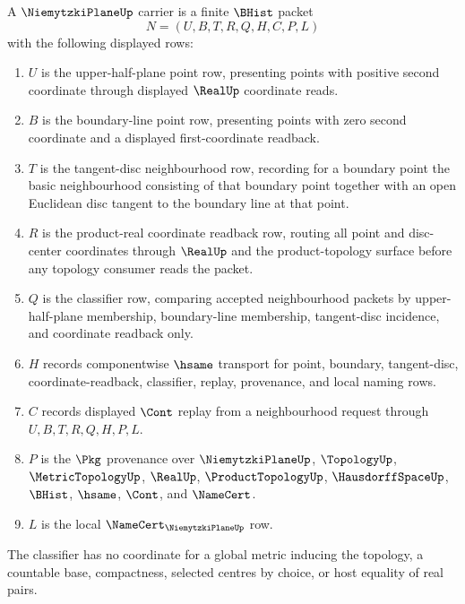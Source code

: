 \begin{definition}
\label{def:niemytzki-plane-carrier}
A $\NiemytzkiPlaneUp$ carrier is a finite $\BHist$ packet
$$
N=(U,B,T,R,Q,H,C,P,L)
$$
with the following displayed rows:
\begin{enumerate}
\item $U$ is the upper-half-plane point row, presenting points with positive second coordinate through displayed $\RealUp$ coordinate reads.
\item $B$ is the boundary-line point row, presenting points with zero second coordinate and a displayed first-coordinate readback.
\item $T$ is the tangent-disc neighbourhood row, recording for a boundary point the basic neighbourhood consisting of that boundary point together with an open Euclidean disc tangent to the boundary line at that point.
\item $R$ is the product-real coordinate readback row, routing all point and disc-center coordinates through $\RealUp$ and the product-topology surface before any topology consumer reads the packet.
\item $Q$ is the classifier row, comparing accepted neighbourhood packets by upper-half-plane membership, boundary-line membership, tangent-disc incidence, and coordinate readback only.
\item $H$ records componentwise $\hsame$ transport for point, boundary, tangent-disc, coordinate-readback, classifier, replay, provenance, and local naming rows.
\item $C$ records displayed $\Cont$ replay from a neighbourhood request through $U,B,T,R,Q,H,P,L$.
\item $P$ is the $\Pkg$ provenance over $\NiemytzkiPlaneUp$, $\TopologyUp$, $\MetricTopologyUp$, $\RealUp$, $\ProductTopologyUp$, $\HausdorffSpaceUp$, $\BHist$, $\hsame$, $\Cont$, and $\NameCert$.
\item $L$ is the local $\NameCert_{\NiemytzkiPlaneUp}$ row.
\end{enumerate}
The classifier has no coordinate for a global metric inducing the topology, a countable base, compactness, selected centres by choice, or host equality of real pairs.
\end{definition}

